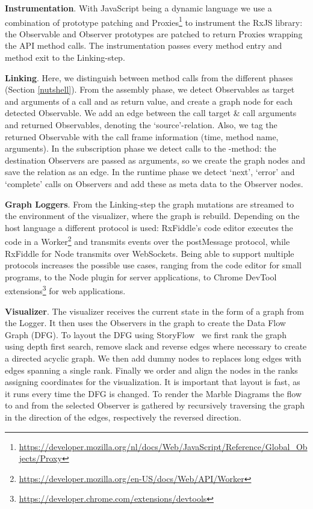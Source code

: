 \textbf{Instrumentation}. With JavaScript being a dynamic language we use a combination of prototype patching and Proxies\footnote{\url{https://developer.mozilla.org/nl/docs/Web/JavaScript/Reference/Global_Objects/Proxy}} to instrument the RxJS library: the Observable and Observer prototypes are patched to return Proxies wrapping the API method calls. The instrumentation passes every method entry and method exit to the Linking-step.

\textbf{Linking}. Here, we distinguish between method calls from the different phases (Section \ref{nutshell}). From the assembly phase, we detect Observables as target and arguments of a call and as return value, and create a graph node for each detected Observable. We add an edge between the call target \& call arguments and returned Observables, denoting the `source'-relation. Also, we tag the returned Observable with the call frame information (time, method name, arguments). In the subscription phase we detect calls to the -method: the destination Observers are passed as arguments, so we create the graph nodes and save the relation as an edge. In the runtime phase we detect `next', `error' and `complete' calls on Observers and add these as meta data to the Observer nodes.

\textbf{Graph Loggers}. From the Linking-step the graph mutations are streamed to the environment of the visualizer, where the graph is rebuild. Depending on the host language a different protocol is used: RxFiddle's code editor executes the code in a Worker\footnote{\url{https://developer.mozilla.org/en-US/docs/Web/API/Worker}} and transmits events over the postMessage protocol, while RxFiddle for Node transmits over WebSockets. Being able to support multiple protocols increases the possible use cases, ranging from the code editor for small programs, to the Node plugin for server applications, to Chrome DevTool extensions\footnote{\url{https://developer.chrome.com/extensions/devtools}} for web applications.

\textbf{Visualizer}. The visualizer receives the current state in the form of a graph from the Logger. It then uses the Observers in the graph to create the Data Flow Graph (DFG). 
To layout the DFG using StoryFlow~\cite{liu2013storyflow} we first rank the graph using depth first search, remove slack and reverse edges where necessary to create a directed acyclic graph. We then add dummy nodes to replaces long edges with edges spanning a single rank. Finally we order and align the nodes in the ranks assigning coordinates for the visualization. It is important that layout is fast, as it runs every time the DFG is changed. To render the Marble Diagrams the flow to and from the selected Observer is gathered by recursively traversing the graph in the direction of the edges, respectively the reversed direction.

